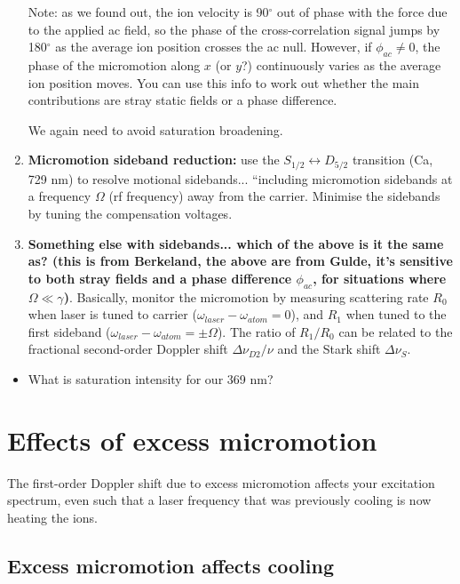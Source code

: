 \documentclass{article}
\begin{document}
\begin{enumerate}
Note: as we found out, the ion velocity is 90$^{\circ}$ out of phase with the force due to the applied ac field, so the phase of the cross-correlation signal jumps by 180$^{\circ}$ as the average ion position crosses the ac null. However, if $\phi_{ac} \neq 0$, the phase of the micromotion along $x$ (or $y$?) continuously varies as the average ion position moves. You can use this info to work out whether the main contributions are stray static fields or a phase difference.

We again need to avoid saturation broadening. 

\item \textbf{Micromotion sideband reduction:} use the $S_{1/2} \leftrightarrow D_{5/2}$ transition (Ca, 729 nm) to resolve motional sidebands... ``including micromotion sidebands at a frequency $\Omega$ (rf frequency) away from the carrier. Minimise the sidebands by tuning the compensation voltages.

\item \textbf{Something else with sidebands... which of the above is it the same as? (this is from Berkeland, the above are from Gulde, it's sensitive to both stray fields and a phase difference $\phi_{ac}$, for situations where $\Omega \ll \gamma$)}. Basically, monitor the micromotion by measuring scattering rate $R_0$ when laser is tuned to carrier ($\omega_{laser} - \omega_{atom} = 0$), and $R_1$ when tuned to the first sideband ($\omega_{laser} - \omega_{atom} = \pm \Omega$). The ratio of $R_1/R_0$ can be related to the fractional second-order Doppler shift $\Delta \nu_{D2} / \nu$ and the Stark shift $\Delta \nu_S$.
\end{enumerate}

\begin{itemize}
\item What is saturation intensity for our 369 nm?
\end{itemize}


\section{Effects of excess micromotion}

The first-order Doppler shift due to excess micromotion affects your excitation spectrum, even such that a laser frequency that was previously cooling is now heating the ions.

\subsection*{Excess micromotion affects cooling}
\end{document}
